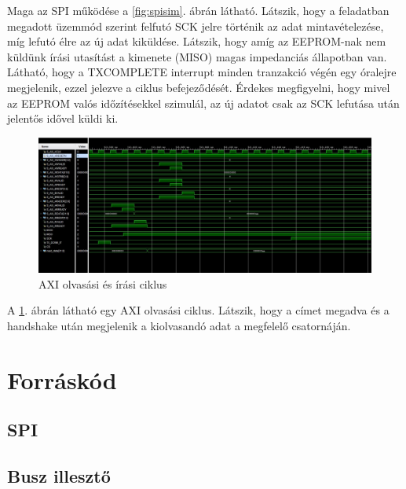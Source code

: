 \documentclass[a4paper,11pt]{article}
\begin{document}
Maga az SPI működése a \ref{fig:spisim}. ábrán látható. Látszik, hogy a feladatban megadott üzemmód szerint felfutó SCK jelre történik az adat mintavételezése, míg lefutó élre az új adat kiküldése. Látszik, hogy amíg az EEPROM-nak nem küldünk írási utasítást a kimenete (MISO) magas impedanciás állapotban van. Látható, hogy a TXCOMPLETE interrupt minden tranzakció végén egy óralejre megjelenik, ezzel jelezve a ciklus befejeződését. Érdekes megfigyelni, hogy mivel az EEPROM valós időzítésekkel szimulál, az új adatot csak az SCK lefutása után jelentős idővel küldi ki.

\begin{figure}[H]
	\begin{center}
	\includegraphics[scale=0.49]{axi_read.JPG}
	\caption{AXI olvasási és írási ciklus}
	\label{fig:axi_read}
	\end{center}
	
\end{figure}

A \ref{fig:axi_read}. ábrán látható egy AXI olvasási ciklus. Látszik, hogy a címet megadva és a handshake után megjelenik a kiolvasandó adat a megfelelő csatornáján.

\section{Forráskód}

\subsection{SPI}



\subsection{Busz illesztő}
\end{document}

